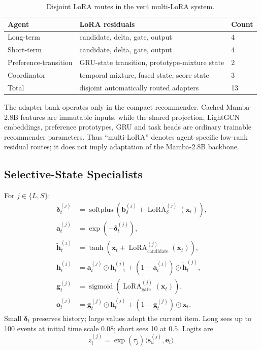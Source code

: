 \documentclass[11pt,a4paper]{article}
\newcommand{\sigmoid}{\operatorname{sigmoid}}
\begin{document}
\begin{table}[H]
\centering
\caption{Disjoint LoRA routes in the ver4 multi-LoRA system.}
\label{tab:lora-routing}
\begin{tabular}{lll}
\toprule
Agent & LoRA residuals & Count\\
\midrule
Long-term & candidate, delta, gate, output & 4\\
Short-term & candidate, delta, gate, output & 4\\
Preference-transition & GRU-state transition, prototype-mixture state & 2\\
Coordinator & temporal mixture, fused state, score state & 3\\
\midrule
Total & disjoint automatically routed adapters & 13\\
\bottomrule
\end{tabular}
\end{table}

The adapter bank operates only in the compact recommender. Cached Mamba-2.8B
features are immutable inputs, while the shared projection, LightGCN embeddings,
preference prototypes, GRU and task heads are ordinary trainable recommender
parameters. Thus ``multi-LoRA'' denotes agent-specific low-rank residual routes;
it does not imply adaptation of the Mamba-2.8B backbone.

\subsection{Selective-State Specialists}

For $j\in\{L,S\}$:
\begin{align}
  \bm\delta_t^{(j)}
  &=
  \operatorname{softplus}
  \left(\bm b_\delta^{(j)}+\operatorname{LoRA}^{(j)}_\delta(\bm x_t)\right),\\
  \bm a_t^{(j)}&=\exp(-\bm\delta_t^{(j)}),\\
  \widetilde{\bm h}_t^{(j)}
  &=
  \tanh\left(\bm x_t+\operatorname{LoRA}^{(j)}_{\mathrm{candidate}}(\bm x_t)\right),\\
  \bm h_t^{(j)}
  &=
  \bm a_t^{(j)}\odot\bm h_{t-1}^{(j)}
  +(1-\bm a_t^{(j)})\odot\widetilde{\bm h}_t^{(j)},\\
  \bm g_t^{(j)}
  &=
  \sigmoid\left(\operatorname{LoRA}^{(j)}_{\mathrm{gate}}(\bm x_t)\right),\\
  \bm o_t^{(j)}
  &=
  \bm g_t^{(j)}\odot\bm h_t^{(j)}
  +(1-\bm g_t^{(j)})\odot\bm x_t.
\end{align}
Small $\bm\delta_t$ preserves history; large values adopt the current item. Long sees up to 100 events at initial time scale $0.08$; short sees 10 at $0.5$. Logits are
\begin{equation}
  z_i^{(j)}=\exp(\tau_j)\langle\bm s_u^{(j)},\bm e_i\rangle.
\end{equation}
\end{document}
